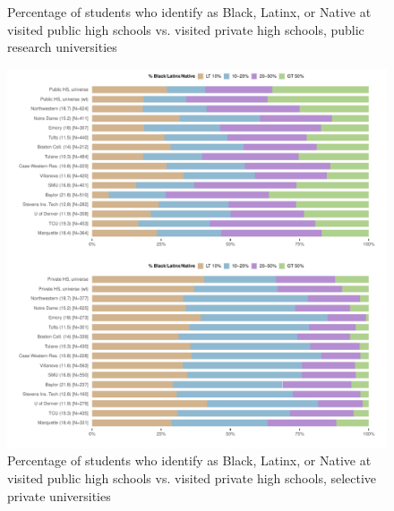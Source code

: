 \documentclass[
]{article}
\newcommand{\beginsupplement}{
\setcounter{table}{0}
\renewcommand{\thetable}{S\arabic{table}}
\setcounter{figure}{0}
\renewcommand{\thefigure}{S\arabic{figure}}}
\begin{document}
\begin{landscape}
\begin{figure}
{}

\caption{Percentage of students who identify as Black, Latinx, or Native at visited public high schools vs. visited private high schools, public research universities}\label{fig:race-pubu-privhs-pubhs}
\end{figure}

\newpage

\begin{figure}

{\centering \includegraphics[width=2\linewidth]{../assets/figures/ego_network_race_privu_privhs_pubhs} 

}

\caption{Percentage of students who identify as Black, Latinx, or Native at visited public high schools vs. visited private high schools, selective private universities}\label{fig:race-privu-privhs-pubhs}
\end{figure}


\beginsupplement
\clearpage
\newpage

\begin{table}


\end{table}
\end{landscape}
\end{document}
